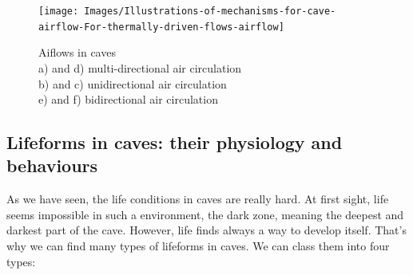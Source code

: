 \documentclass{article}
\begin{document}
\begin{figure}[!ht]
  \centering
  \texttt{[image: Images/Illustrations-of-mechanisms-for-cave-airflow-For-thermally-driven-flows-airflow]}
  \caption{Aiflows in caves
    \\ a) and d) multi-directional air circulation
    \\ b) and c) unidirectional air circulation
    \\ e) and f) bidirectional air circulation \cite{CaveAirCirculation}}
    \label{Airflows}
\end{figure}

\clearpage

\subsection{Lifeforms in caves: their physiology and behaviours}

As we have seen, the life conditions in caves are really hard. At first sight, life seems impossible in such a environment, the dark zone, meaning the deepest and darkest part of the cave. However, life finds always a way to develop itself. That’s why we can find many types of lifeforms in caves. We can class them into four types:
\end{document}
